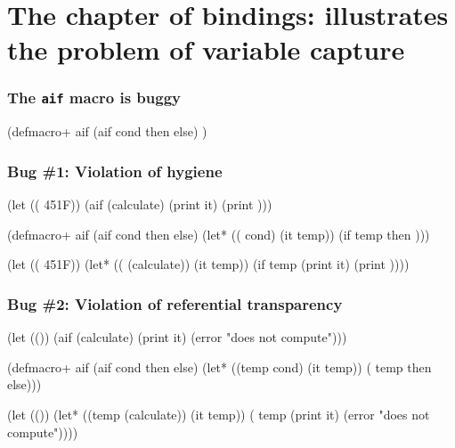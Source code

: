 \documentclass[hyperref={bookmarks=false}]{beamer}
\begin{document}
\section{The chapter of bindings: illustrates the problem of variable capture}

\begin{frame}[fragile]
\frametitle{The \texttt{aif} macro is buggy}
\begin{semiverbatim}
\text{\color{blue}{(aif (calculate)}}
  \text{\color{blue}{(print it)}}
  \text{\color{blue}{(error "does not compute"))}}

(defmacro+ aif
  (aif cond then else)
  \text{\color{red}{(let* ((temp cond)}}
         \text{\color{red}{(it temp))}}
    \text{\color{red}{(if temp then else))}})

\end{semiverbatim}
\end{frame}

\begin{frame}[fragile]
\frametitle{Bug \#1: Violation of hygiene}
\begin{semiverbatim}
(let ((\text{\color{blue}{temp}} 451{\textdegree}F))
  (aif (calculate)
    (print it)
    (print \text{\color{blue}{temp}})))

(defmacro+ aif
  (aif cond then else)
  (let* ((\text{\color{red}{temp}} cond)
         (it temp))
    (if temp then \text{\color{red}{else}})))

(let ((\text{\color{blue}{temp}} 451{\textdegree}F))
  (let* ((\text{\color{red}{temp}} (calculate))
         (it temp))
    (if temp
      (print it)
      (print \text{\color{red}{temp}}))))
\end{semiverbatim}
\end{frame}

\begin{frame}[fragile]
\frametitle{Bug \#2: Violation of referential transparency}
\begin{semiverbatim}
(let ((\text{\color{blue}{if hijacked}}))
  (aif (calculate)
    (print it)
    (error "does not compute")))

(defmacro+ aif
  (aif cond then else)
  (let* ((temp cond)
         (it temp))
    (\text{\color{red}{if}} temp then else))) \text{\color{red}{;; core if}}

(let ((\text{\color{blue}{if hijacked}}))
  (let* ((temp (calculate))
         (it temp))
    (\text{\color{blue}{if}} temp \text{\color{blue}{;; hijacked if}}
      (print it)
      (error "does not compute"))))
\end{semiverbatim}
\end{frame}
\end{document}
